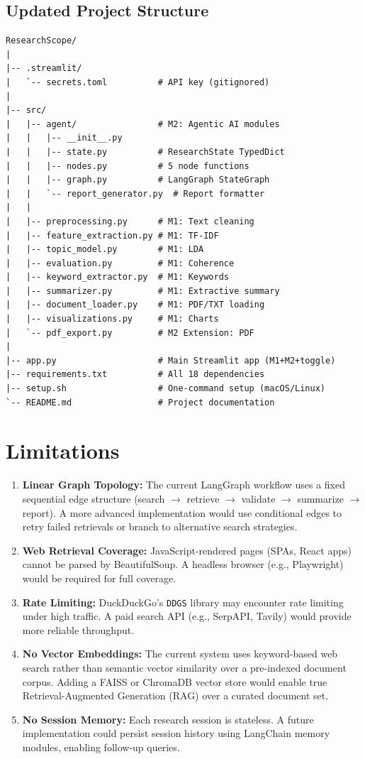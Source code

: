 \documentclass[12pt, a4paper]{article}
\begin{document}
\subsection{Updated Project Structure}
\begin{lstlisting}[language={}]
ResearchScope/
|
|-- .streamlit/
|   `-- secrets.toml          # API key (gitignored)
|
|-- src/
|   |-- agent/                # M2: Agentic AI modules
|   |   |-- __init__.py
|   |   |-- state.py          # ResearchState TypedDict
|   |   |-- nodes.py          # 5 node functions
|   |   |-- graph.py          # LangGraph StateGraph
|   |   `-- report_generator.py  # Report formatter
|   |
|   |-- preprocessing.py      # M1: Text cleaning
|   |-- feature_extraction.py # M1: TF-IDF
|   |-- topic_model.py        # M1: LDA
|   |-- evaluation.py         # M1: Coherence
|   |-- keyword_extractor.py  # M1: Keywords
|   |-- summarizer.py         # M1: Extractive summary
|   |-- document_loader.py    # M1: PDF/TXT loading
|   |-- visualizations.py     # M1: Charts
|   `-- pdf_export.py         # M2 Extension: PDF
|
|-- app.py                    # Main Streamlit app (M1+M2+toggle)
|-- requirements.txt          # All 18 dependencies
|-- setup.sh                  # One-command setup (macOS/Linux)
`-- README.md                 # Project documentation
\end{lstlisting}

\section{Limitations}


\begin{enumerate}
  \item \textbf{Linear Graph Topology:} The current LangGraph workflow uses a fixed sequential edge structure (search $\to$ retrieve $\to$ validate $\to$ summarize $\to$ report). A more advanced implementation would use conditional edges to retry failed retrievals or branch to alternative search strategies.
  \item \textbf{Web Retrieval Coverage:} JavaScript-rendered pages (SPAs, React apps) cannot be parsed by BeautifulSoup. A headless browser (e.g., Playwright) would be required for full coverage.
  \item \textbf{Rate Limiting:} DuckDuckGo's \texttt{DDGS} library may encounter rate limiting under high traffic. A paid search API (e.g., SerpAPI, Tavily) would provide more reliable throughput.
  \item \textbf{No Vector Embeddings:} The current system uses keyword-based web search rather than semantic vector similarity over a pre-indexed document corpus. Adding a FAISS or ChromaDB vector store would enable true Retrieval-Augmented Generation (RAG) over a curated document set.
  \item \textbf{No Session Memory:} Each research session is stateless. A future implementation could persist session history using LangChain memory modules, enabling follow-up queries.
\end{enumerate}
\end{document}
